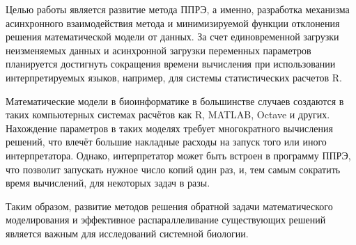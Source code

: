 Целью работы является развитие метода ППРЭ,
а именно, разработка механизма асинхронного
взаимодействия метода и
минимизируемой функции отклонения
решения математической модели от
данных. За счет единовременной загрузки
неизменяемых данных и асинхронной
загрузки переменных параметров планируется
достигнуть сокращения времени вычисления
при использовании интерпретируемых
языков, например, для системы статистических
расчетов R.

Математические модели в биоинформатике
в большинстве случаев создаются
в таких компьютерных системах расчётов
как R, MATLAB, Octave и других.
Нахождение параметров в таких моделях
требует многократного вычисления решений,
что влечёт большие накладные расходы на запуск
того или иного интерпретатора.
Однако, интерпретатор может быть встроен в программу ППРЭ,
что позволит запускать нужное число копий один раз,
и, тем самым сократить время вычислений, для некоторых задач в разы.

Таким образом,
развитие методов решения обратной задачи математического моделирования
и эффективное распараллеливание существующих решений
является важным для исследований системной биологии.

